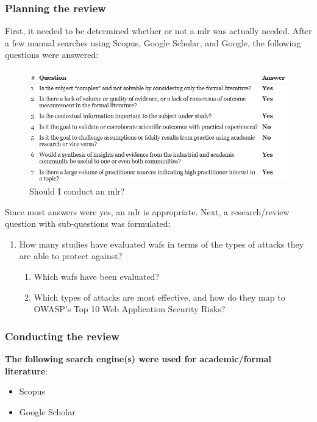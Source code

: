 \subsubsection{Planning the review}
First, it needed to be determined whether or not a \acrshort{mlr} was actually needed. After a few manual searches using Scopus, Google Scholar, and Google, the following questions \cite{garousi2019guidelines} were answered:

\begin{figure}[htbp]  %
  \centering
  \includegraphics[width=.8\textwidth]{figures/planning_review_1.png}
  \caption[MLR Question]{Should I conduct an \acrshort{mlr}?}
  \label{fig:planning_review_1}
\end{figure}

Since most answers were yes, an \acrshort{mlr} is appropriate. Next, a research/review question with sub-questions was formulated:

\begin{enumerate}
    \item How many studies have evaluated \acrshort{waf}s in terms of the types of attacks they are able to protect against?
    \begin{enumerate} 
        \item Which \acrshort{waf}s have been evaluated?
        \item Which types of attacks are most effective, and how do they map to OWASP’s Top 10 Web Application Security Risks?
    \end{enumerate}
\end{enumerate}

\subsubsection{Conducting the review}
\textbf{The following search engine(s) were used for academic/formal literature}:
\begin{itemize}
    \item Scopus
    \item Google Scholar
\end{itemize}

